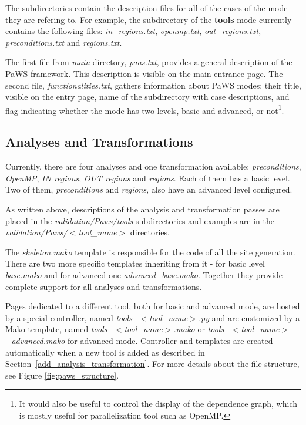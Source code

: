The subdirectories contain the description files for all of the cases
of the mode they are refering to. For example, the subdirectory of the
{\bf tools} mode currently contains the following files: \emph{in\_regions.txt},
\emph{openmp.txt}, \emph{out\_regions.txt}, \emph{preconditions.txt}
and \emph{regions.txt}.

The first file from \emph{main} directory, \emph{paas.txt}, provides a
general description of the PaWS framework. This description is visible
on the main entrance page. The second file,
\emph{functionalities.txt}, gathers information about PaWS modes:
their title, visible on the entry page, name of the subdirectory with
case descriptions, and flag indicating whether the mode has two levels,
basic and advanced, or not\footnote{It would also be useful to control
the display of the dependence graph, which is mostly useful for
parallelization tool such as OpenMP.}.

\subsection{Analyses and Transformations}

Currently, there are four analyses and one transformation available:
\emph{preconditions}, \emph{OpenMP}, \emph{IN regions}, \emph{OUT
  regions} and \emph{regions}. Each of them has a basic level. Two of
them, \emph{preconditions} and \emph{regions}, also have an advanced
level configured.

As written above, descriptions of the analysis and transformation
passes are placed in the \emph{validation/Paws/tools} subdirectories
and examples are in the \emph{validation/Paws/$<$tool\_name$>$}
directories.

The \emph{skeleton.mako} template is responsible for the code of all the
site generation. There are two more specific templates inheriting
from it - for basic level \emph{base.mako} and for advanced one
\emph{advanced\_base.mako}. Together they provide complete support for
all analyses and transformations.

Pages dedicated to a different tool, both for basic and advanced mode,
are hosted by a special controller, named
\emph{tools\_$<$tool\_name$>$.py} and are customized by a Mako
template, named \emph{tools\_$<$tool\_name$>$.mako} or
\emph{tools\_$<$tool\_name$>$\_advanced.mako} for advanced
mode. Controller and templates are created automatically when a new
tool is added as described in
Section~\ref{add_analysis_transformation}. For more details about the
file structure, see Figure \ref{fig:paws_structure}.

